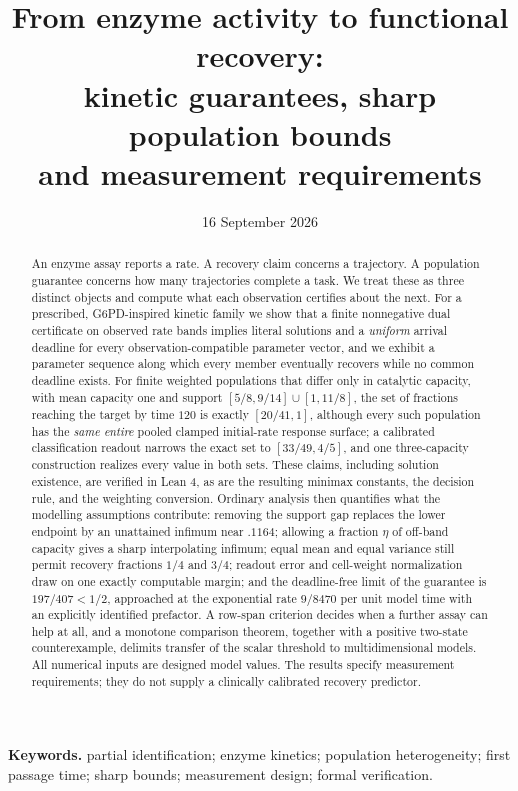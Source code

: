 \documentclass[11pt]{article}
\title{From enzyme activity to functional recovery:\\
kinetic guarantees, sharp population bounds\\ and measurement requirements}
\author{}
\date{16 September 2026}
\theoremstyle{definition}
\begin{document}
\maketitle

\begin{abstract}
An enzyme assay reports a rate. A recovery claim concerns a trajectory. A
population guarantee concerns how many trajectories complete a task. We treat
these as three distinct objects and compute what each observation certifies
about the next. For a prescribed, G6PD-inspired kinetic family we show that a
finite nonnegative dual certificate on observed rate bands implies literal
solutions and a \emph{uniform} arrival deadline for every
observation-compatible parameter vector, and we exhibit a parameter sequence
along which every member eventually recovers while no common deadline exists.
For finite weighted populations that differ only in catalytic capacity, with
mean capacity one and support $[5/8,9/14]\cup[1,11/8]$, the set of fractions
reaching the target by time $120$ is exactly $[20/41,1]$, although every such
population has the \emph{same entire} pooled clamped initial-rate response
surface; a calibrated classification readout narrows the exact set to
$[33/49,4/5]$, and one three-capacity construction realizes every value in
both sets. These claims, including solution existence, are verified in Lean 4,
as are the resulting minimax constants, the decision rule, and the
weighting conversion. Ordinary analysis then quantifies what the modelling
assumptions contribute: removing the support gap replaces the lower endpoint
by an unattained infimum near $.1164$; allowing a fraction $\eta$ of off-band
capacity gives a sharp interpolating infimum; equal mean and equal variance
still permit recovery fractions $1/4$ and $3/4$; readout error and cell-weight
normalization draw on one exactly computable margin; and the deadline-free
limit of the guarantee is $197/407<1/2$, approached at the exponential rate
$9/8470$ per unit model time with an explicitly identified prefactor. A
row-span criterion decides when a further assay can help at all, and a
monotone comparison theorem, together with a positive two-state
counterexample, delimits transfer of the scalar threshold to multidimensional
models. All numerical inputs are designed model values. The results specify
measurement requirements; they do not supply a clinically calibrated recovery
predictor.
\end{abstract}

\noindent\textbf{Keywords.} partial identification; enzyme kinetics;
population heterogeneity; first passage time; sharp bounds; measurement
design; formal verification.
\end{document}
